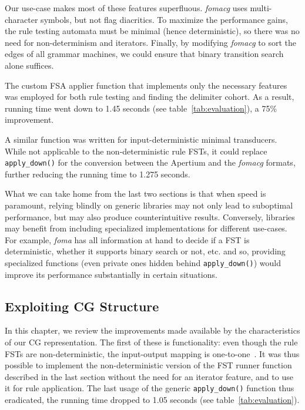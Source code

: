 \documentclass[11pt]{article}
\begin{document}
Our use-case makes most of these features superfluous. \emph{fomacg} uses
multi-character symbols, but not flag diacritics. To maximize the performance
gains, the rule testing automata must be minimal (hence deterministic), so
there was no need for non-determinism and iterators. Finally, by modifying
\emph{fomacg} to sort the edges of all grammar machines, we could ensure that
binary transition search alone suffices.

The custom FSA applier function that implements only the necessary features
was employed for both rule testing and finding the delimiter cohort. As a result,
running time went down to 1.45 seconds (see table~\ref{tab:evaluation}), a 75\%
improvement.

A similar function was written for input-deterministic minimal transducers.
While not applicable to the non-deterministic rule FSTs, it could
replace \texttt{apply\_down()} for the conversion between the Apertium and  %
the \emph{fomacg} formats, further reducing the running time to 1.275 seconds.


What we can take home from the last two sections is that when speed is paramount,
relying blindly on generic libraries may not only lead to suboptimal performance,
but may also produce counterintuitive results.
Conversely, libraries may benefit from including specialized implementations
for different use-cases. For example, \emph{foma} has all information at hand
to decide if a FST is deterministic, whether it supports binary search or not,
etc. and so, providing specialized functions (even private ones hidden behind
\texttt{apply\_down()}) would improve its performance substantially in certain
situations.

\subsection{Exploiting CG Structure}  %
\label{sec:speed_cg}

In this chapter, we review the improvements made available by the
characteristics of our CG representation. The first of these is functionality:
even though the rule FSTs are non-deterministic, the input-output mapping is
one-to-one~\cite{Hulden:2011}. It was thus possible to implement the
non-deterministic version of the FST runner function described in the last
section without the need for an iterator feature, and to use it for rule
application. The last usage of the generic \texttt{apply\_down()} function  %
thus eradicated, the running time dropped to 1.05 seconds (see
table~\ref{tab:evaluation}).
\end{document}
